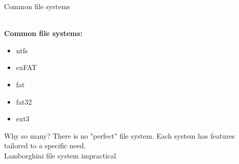 \begin{frame}[t]{Common file systems}

  \hspace*{.6in}
  \begin{minipage}{3.5in}
	\vspace*{.3in}
	\\\textbf{Common file systems:}
	\begin{itemize}
	\renewcommand{\labelitemi}{$\bullet$}
		\item ntfs
		\item exFAT
		\item fat
		\item fat32
		\item ext3
	\end{itemize}
	\vspace*{.2in}
	Why so many? There is no "perfect" file system. Each system has features tailored to a specific need.
	\vspace*{.2in}
  	\\Lamborghini file system impractical
  \end{minipage}

\end{frame}